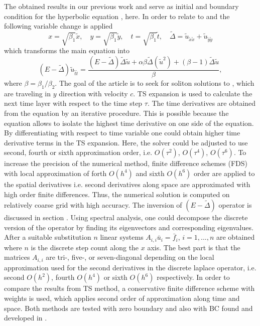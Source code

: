 \documentclass[11pt,a4paper,twoside]{article}
\begin{document}
The obtained results in our previous work \cite{EllipticProblem} and \cite{BoundaryProblem} serve as initial and boundary condition for the hyperbolic equation ,   here. In order to relate to \cite{EllipticProblem} and \cite{BoundaryProblem}
the following variable change is applied
\begin{equation}\label{vc}
x = \sqrt{\beta_1} \tilde x, \quad y = \sqrt{\beta_1} \tilde y, \quad t = \sqrt{\beta_1} \tilde t, \quad \tilde \Delta = \tilde u_{\tilde x \tilde x} + \tilde u_{\tilde y \tilde y}
\end{equation}
which transforms the main equation   into 
\begin{equation}\label{eqVC}
(E-\tilde \Delta)  \tilde u_{\tilde t \tilde t} = \frac{(E-\tilde\Delta)\tilde\Delta \tilde u + \alpha \beta \tilde\Delta(\tilde u^2) + (\beta -1)\tilde\Delta \tilde u}{\beta},
\end{equation}
where $\beta = \beta_1 / \beta_2$. The goal of the article is to seek for soliton solutions to , which 
are traveling  in $y$ direction with velocity $c$. TS expansion is used to calculate the next time layer with respect to the time step $\tau$. The time derivatives
are obtained from the equation  by an iterative procedure. This is possible because the equation allows to isolate the highest time derivative on one side of the equation. By differentiating with respect to time variable one could obtain higher time derivative terms in the TS expansion. Here, the solver could be adjusted to use second, fourth or sixth approximation order, i.e. $O(\tau^2)$, $O(\tau^4)$, $O(\tau^6)$. To increase the precision of the numerical method, finite difference schemes (FDS) with local approximation of forth $O(h^4)$ and sixth $O(h^6)$ order are applied to the spatial derivatives i.e.  second derivatives along space are approximated with high order finite differences. Thus, the numerical solution is computed on relatively coarse grid with high accuracy. The inversion of $(E - \tilde \Delta)$ operator is discussed in section . Using spectral analysis, one could decompose the discrete version of the operator by finding its eigenvectors and corresponding eigenvalues. After a suitable substitution $n$ linear systems $A_{i,i} \bar u_i = \bar f_i$, $i = 1,...,n$ are obtained where $n$ is the discrete step count along the $x$ axis. The best part is that the matrices $A_{i,i}$ are tri-, five-, or seven-diagonal depending on the local approximation used for the second derivatives in the discrete laplace operator, i.e. second $O(h^2)$,  fourth $O(h^4)$ or sixth $O(h^6)$ respectively. In order to compare the results from TS method, a conservative finite difference scheme with weights is used, which applies second order of approximation along time and space.
Both methods are tested with zero boundary and also with BC found and developed in \cite{BoundaryProblem}.
\end{document}
